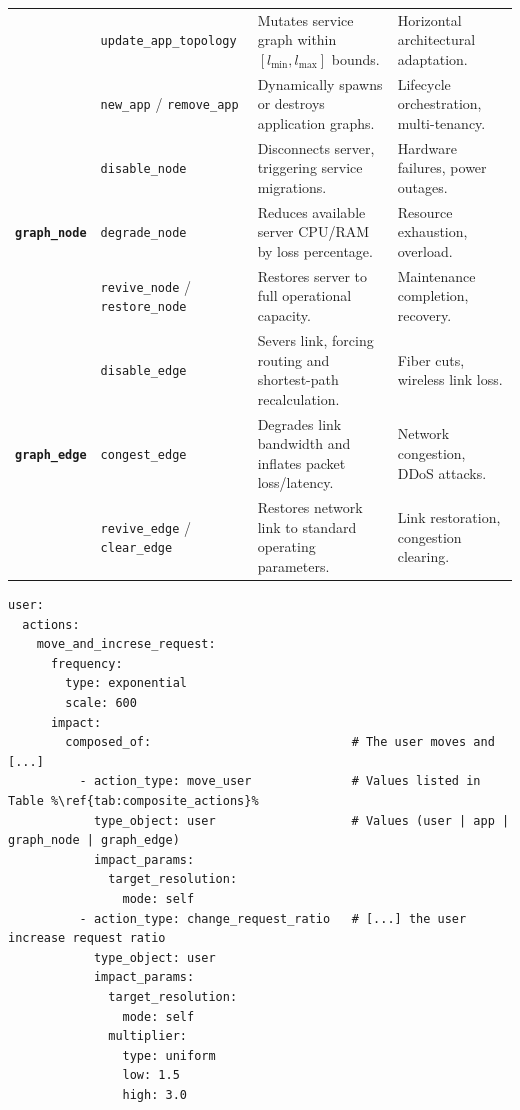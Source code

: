 \documentclass[ASNA]{USG} %
\begin{document}
\begin{center}
\begin{table}[!ht]
\begin{tabular*}{\textwidth}{@{\extracolsep\fill}ll p{6.0cm} p{5.0cm}@{\extracolsep\fill}}
 & \texttt{update\_app\_topology} & Mutates service graph within $[l_{\min}, l_{\max}]$ bounds. & Horizontal architectural adaptation. \\
 & \texttt{new\_app} / \texttt{remove\_app} & Dynamically spawns or destroys application graphs. & Lifecycle orchestration, multi-tenancy. \\
\midrule
\multirow{3}{*}{\textbf{\texttt{graph\_node}}} 
 & \texttt{disable\_node} & Disconnects server, triggering service migrations. & Hardware failures, power outages. \\
 & \texttt{degrade\_node} & Reduces available server CPU/RAM by loss percentage. & Resource exhaustion, overload. \\
 & \texttt{revive\_node} / \texttt{restore\_node} & Restores server to full operational capacity. & Maintenance completion, recovery. \\
\midrule
\multirow{3}{*}{\textbf{\texttt{graph\_edge}}} 
 & \texttt{disable\_edge} & Severs link, forcing routing and shortest-path recalculation. & Fiber cuts, wireless link loss. \\
 & \texttt{congest\_edge} & Degrades link bandwidth and inflates packet loss/latency. & Network congestion, DDoS attacks. \\
 & \texttt{revive\_edge} / \texttt{clear\_edge} & Restores network link to standard operating parameters. & Link restoration, congestion clearing. \\
\bottomrule
\end{tabular*}

\end{table}
\end{center}

\begin{lstlisting}[escapechar=\%,caption={YAML configuration of a combined move-increase activity user event.},label=lst:yaml_catastrophic, basicstyle=\fontsize{8}{10}\selectfont\ttfamily]
user:
  actions:
    move_and_increse_request:
      frequency:
        type: exponential
        scale: 600
      impact:
        composed_of:                            # The user moves and [...]
          - action_type: move_user              # Values listed in Table %\ref{tab:composite_actions}%
            type_object: user                   # Values (user | app | graph_node | graph_edge)
            impact_params:
              target_resolution:
                mode: self
          - action_type: change_request_ratio   # [...] the user increase request ratio
            type_object: user
            impact_params:
              target_resolution:
                mode: self    
              multiplier:
                type: uniform
                low: 1.5
                high: 3.0
\end{lstlisting}
\end{document}
